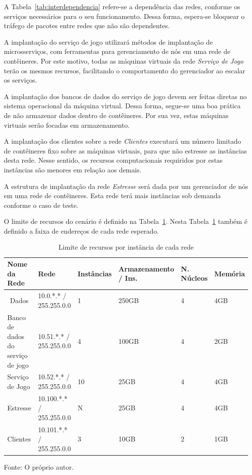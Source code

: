 A Tabela~\ref{tab:interdependencia} refere-se a dependência das redes, conforme os serviços necessários para o seu funcionamento.
%
Dessa forma, espera-se bloquear o tráfego de pacotes entre redes que não são dependentes.

A implantação do serviço de jogo utilizará métodos de implantação de microsserviços, com ferramentas para gerenciamento de nós em uma rede de contêineres.
%
Por este motivo, todas as máquinas virtuais da rede \textit{Serviço de Jogo} terão os mesmos recursos, facilitando o comportamento do gerenciador ao escalar os serviços.

A implantação dos bancos de dados do serviço de jogo devem ser feitas diretas no sistema operacional da máquina virtual.
%
Dessa forma, segue-se uma boa prática de não armazenar dados dentro de contêineres.
%
Por sua vez, estas máquinas virtuais serão focadas em armazenamento.

A implantação dos clientes sobre a rede \textit{Clientes} executará um número limitado de contêineres fixo sobre as máquinas virtuais, para que não estresse as instâncias desta rede.
%
Nesse sentido, os recursos computacionais requiridos por estas instâncias são menores em relação aos demais.

A estrutura de implantação da rede \textit{Estresse} será dada por um gerenciador de nós em uma rede de contêineres.
%
Esta rede terá mais instâncias sob demanda conforme o caso de teste.

O limite de recursos do cenário é definido na Tabela~\ref{tab:limite_recursos}.
%
Nesta Tabela~\ref{tab:limite_recursos} também é definido a faixa de endereços de cada rede esperado.

\begin{table}[htb!]
\centering
\begin{adjustbox}{max width=\textwidth}
\caption{Limite de recursos por instância de cada rede}
\label{tab:limite_recursos}
\begin{tabular}{|l|l|l|l|l|l|}
\hline
Nome da Rede                      & Rede                     & Instâncias & Armazenamento / Ins. & N. Núcleos & Memória \\ \hline
\multicolumn{1}{|c|}{Dados}       & 10.0.*.* / 255.255.0.0   & 1          & 250GB                & 4          & 4GB     \\ \hline
Banco de dados do serviço de jogo & 10.51.*.* / 255.255.0.0  & 4          & 100GB                & 4          & 2GB     \\ \hline
Serviço de Jogo                   & 10.52.*.* / 255.255.0.0  & 10         & 25GB                 & 4          & 4GB     \\ \hline
Estresse                          & 10.100.*.* / 255.255.0.0 & N          & 25GB                 & 4          & 4GB     \\ \hline
Clientes                          & 10.101.*.* / 255.255.0.0 & 3          & 10GB                 & 2          & 1GB     \\ \hline
\end{tabular}
\end{adjustbox}

Fonte: O próprio autor.
\end{table}

